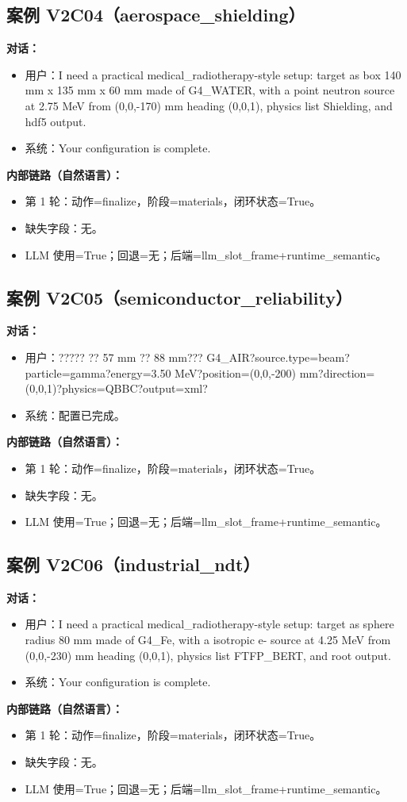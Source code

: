 \documentclass[11pt]{ctexart}
\begin{document}
\subsection{案例 V2C04（aerospace\_shielding）}
\textbf{对话：}
\begin{itemize}
\item 用户：I need a practical medical\_radiotherapy-style setup: target as box 140 mm x 135 mm x 60 mm made of G4\_WATER, with a point neutron source at 2.75 MeV from (0,0,-170) mm heading (0,0,1), physics list Shielding, and hdf5 output.
\item 系统：Your configuration is complete.
\end{itemize}
\textbf{内部链路（自然语言）：}
\begin{itemize}
\item 第 1 轮：动作=finalize，阶段=materials，闭环状态=True。
\item 缺失字段：无。
\item LLM 使用=True；回退=无；后端=llm\_slot\_frame+runtime\_semantic。
\end{itemize}
\subsection{案例 V2C05（semiconductor\_reliability）}
\textbf{对话：}
\begin{itemize}
\item 用户：????? ?? 57 mm ?? 88 mm??? G4\_AIR?source.type=beam?particle=gamma?energy=3.50 MeV?position=(0,0,-200) mm?direction=(0,0,1)?physics=QBBC?output=xml?
\item 系统：配置已完成。
\end{itemize}
\textbf{内部链路（自然语言）：}
\begin{itemize}
\item 第 1 轮：动作=finalize，阶段=materials，闭环状态=True。
\item 缺失字段：无。
\item LLM 使用=True；回退=无；后端=llm\_slot\_frame+runtime\_semantic。
\end{itemize}
\subsection{案例 V2C06（industrial\_ndt）}
\textbf{对话：}
\begin{itemize}
\item 用户：I need a practical medical\_radiotherapy-style setup: target as sphere radius 80 mm made of G4\_Fe, with a isotropic e- source at 4.25 MeV from (0,0,-230) mm heading (0,0,1), physics list FTFP\_BERT, and root output.
\item 系统：Your configuration is complete.
\end{itemize}
\textbf{内部链路（自然语言）：}
\begin{itemize}
\item 第 1 轮：动作=finalize，阶段=materials，闭环状态=True。
\item 缺失字段：无。
\item LLM 使用=True；回退=无；后端=llm\_slot\_frame+runtime\_semantic。
\end{itemize}
\end{document}

